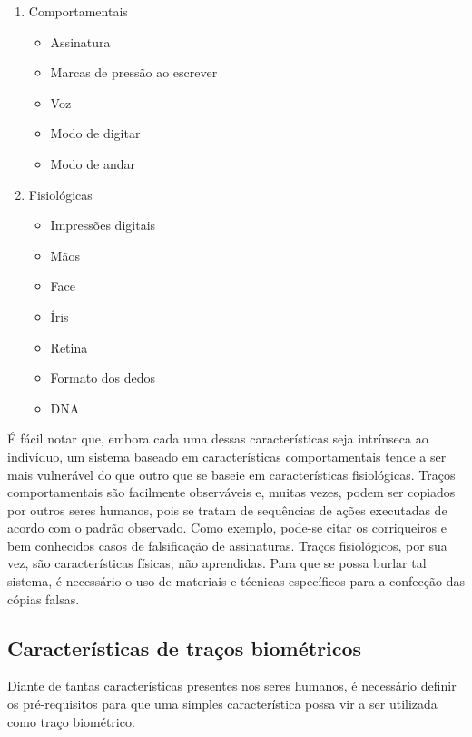 \begin{enumerate}
	\item Comportamentais
	\begin{itemize}
		\item Assinatura
		\item Marcas de pressão ao escrever
		\item Voz
		\item Modo de digitar
		\item Modo de andar
	\end{itemize}

	\item Fisiológicas
	\begin{itemize}
		\item Impressões digitais
		\item Mãos
		\item Face
		\item Íris
		\item Retina
		\item Formato dos dedos
		\item DNA
	\end{itemize}
\end{enumerate}

É fácil notar que, embora cada uma dessas características seja intrínseca ao indivíduo, um sistema baseado em características comportamentais tende a ser mais vulnerável do que outro que se baseie em características fisiológicas. Traços comportamentais são facilmente observáveis e, muitas vezes, podem ser copiados por outros seres humanos, pois se tratam de sequências de ações executadas de acordo com o padrão observado. Como exemplo, pode-se citar os corriqueiros e bem conhecidos casos de falsificação de assinaturas. Traços fisiológicos, por sua vez, são características físicas, não aprendidas. Para que se possa burlar tal sistema, é necessário o uso de materiais e técnicas específicos para a confecção das cópias falsas.

\subsection{Características de traços biométricos} \label{caracteristicas}
Diante de tantas características presentes nos seres humanos, é necessário definir os pré-requisitos para que uma simples característica possa vir a ser utilizada como traço biométrico.

